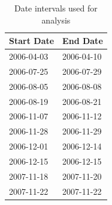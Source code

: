 \documentclass[draft,linenumbers]{agujournal2018}
\begin{document}
\begin{table}[h]
\caption{Date intervals used for analysis}
\centering
\begin{tabular}{l l}
\hline
Start Date & End Date\\
\hline
2006-04-03 & 2006-04-10\\
2006-07-25 & 2006-07-29\\
2006-08-05 & 2006-08-08\\
2006-08-19 & 2006-08-21\\
2006-11-07 & 2006-11-12\\
2006-11-28 & 2006-11-29\\
2006-12-01 & 2006-12-14\\
2006-12-15 & 2006-12-15\\
2007-11-18 & 2007-11-20\\
2007-11-22 & 2007-11-22\\
\hline
\end{tabular}
\label{intervals}
\end{table}
\end{document}

